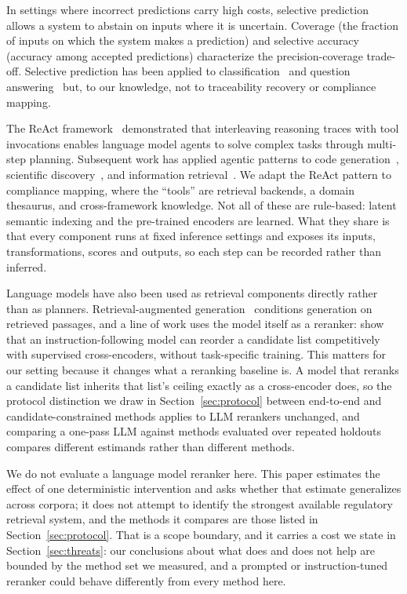 \documentclass[smallextended,natbib]{svjour3}
\begin{document}
In settings where incorrect predictions carry high costs, selective prediction~\citep{ElYaniv2010,Geifman2017} allows a system to abstain on inputs where it is uncertain.
Coverage (the fraction of inputs on which the system makes a prediction) and selective accuracy (accuracy among accepted predictions) characterize the precision-coverage trade-off.
Selective prediction has been applied to classification~\citep{Geifman2019} and question answering~\citep{Kamath2020} but, to our knowledge, not to traceability recovery or compliance mapping.

The ReAct framework~\citep{Yao2023} demonstrated that interleaving reasoning traces with tool invocations enables language model agents to solve complex tasks through multi-step planning.
Subsequent work has applied agentic patterns to code generation~\citep{Yang2024}, scientific discovery~\citep{Bran2024}, and information retrieval~\citep{Shao2024}.
We adapt the ReAct pattern to compliance mapping, where the ``tools'' are retrieval backends, a domain thesaurus, and cross-framework knowledge. Not all of these are rule-based: latent semantic indexing and the pre-trained encoders are learned. What they share is that every component runs at fixed inference settings and exposes its inputs, transformations, scores and outputs, so each step can be recorded rather than inferred.

Language models have also been used as retrieval components directly rather than as planners.
Retrieval-augmented generation~\citep{Lewis2020} conditions generation on retrieved passages, and a line of work uses the model itself as a reranker: \citet{Sun2023} show that an instruction-following model can reorder a candidate list competitively with supervised cross-encoders, without task-specific training.
This matters for our setting because it changes what a reranking baseline is.
A model that reranks a candidate list inherits that list's ceiling exactly as a cross-encoder does, so the protocol distinction we draw in Section~\ref{sec:protocol} between end-to-end and candidate-constrained methods applies to LLM rerankers unchanged, and comparing a one-pass LLM against methods evaluated over repeated holdouts compares different estimands rather than different methods.

We do not evaluate a language model reranker here. This paper estimates the effect of one deterministic intervention and asks whether that estimate generalizes across corpora; it does not attempt to identify the strongest available regulatory retrieval system, and the methods it compares are those listed in Section~\ref{sec:protocol}. That is a scope boundary, and it carries a cost we state in Section~\ref{sec:threats}: our conclusions about what does and does not help are bounded by the method set we measured, and a prompted or instruction-tuned reranker could behave differently from every method here.
\end{document}
